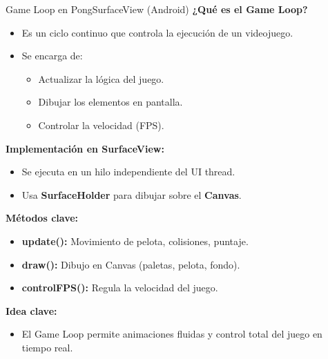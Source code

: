 \begin{frame}[fragile]{Game Loop en PongSurfaceView (Android)}
\textbf{¿Qué es el Game Loop?}

\begin{itemize}
    \item Es un ciclo continuo que controla la ejecución de un videojuego.
    \item Se encarga de:
    \begin{itemize}
        \item Actualizar la lógica del juego.
        \item Dibujar los elementos en pantalla.
        \item Controlar la velocidad (FPS).
    \end{itemize}
\end{itemize}

\textbf{Implementación en SurfaceView:}
\begin{itemize}
    \item Se ejecuta en un hilo independiente del UI thread.
    \item Usa \textbf{SurfaceHolder} para dibujar sobre el \textbf{Canvas}.
\end{itemize}


\textbf{Métodos clave:}
\begin{itemize}
    \item \textbf{update():} Movimiento de pelota, colisiones, puntaje.
    \item \textbf{draw():} Dibujo en Canvas (paletas, pelota, fondo).
    \item \textbf{controlFPS():} Regula la velocidad del juego.
\end{itemize}


\textbf{Idea clave:}
\begin{itemize}
    \item El Game Loop permite animaciones fluidas y control total del juego en tiempo real.
\end{itemize}

\end{frame}



